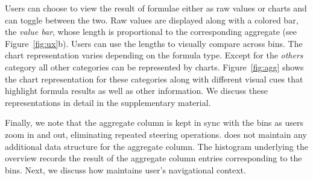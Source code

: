 Users can choose to view the result of formulae
either as raw values or charts and can toggle between the two.
Raw values are displayed
along with a colored bar, the \emph{value bar},
whose length is proportional to
the corresponding aggregate (see Figure~\ref{fig:ux}b). Users can use the lengths to visually compare across bins.
The chart representation varies depending on the formula type.
Except for the \emph{others} category
all other categories can be represented by charts.
Figure~\ref{fig:agg} shows the
chart representation for these categories
along with different visual cues
that highlight formula results
as well as other information. We discuss these representations 
in detail in the supplementary material.


Finally, we note that the aggregate column
is kept in sync with the bins
as users zoom in and out,
eliminating repeated steering operations.
\noah does not maintain
any additional data structure for the aggregate column.
The histogram underlying the overview
records the result of the aggregate column entries
corresponding to the bins.
Next, we discuss how \noah maintains user's navigational context.


